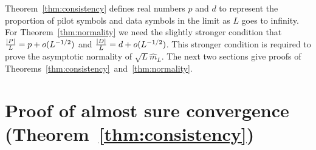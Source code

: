 \documentclass[journal]{IEEEtran}
\begin{document}
Theorem~\ref{thm:consistency} defines real numbers $p$ and $d$ to represent the proportion of pilot symbols and data symbols in the limit as $L$ goes to infinity.  For Theorem~\ref{thm:normality} we need the slightly stronger condition that $\frac{{\left\vert P \right\vert}}{L} = p + o(L^{-1/2})$ and $\frac{{\left\vert D \right\vert}}{L} = d + o(L^{-1/2})$.  
This stronger condition is required to prove the asymptotic normality of $\sqrt{L}\hat{m}_L$.  The next two sections give proofs of Theorems~\ref{thm:consistency}~and~\ref{thm:normality}.  %




\section{Proof of almost sure convergence (Theorem~\ref{thm:consistency}) } \label{sec:proof-almost-sure}
\end{document}
